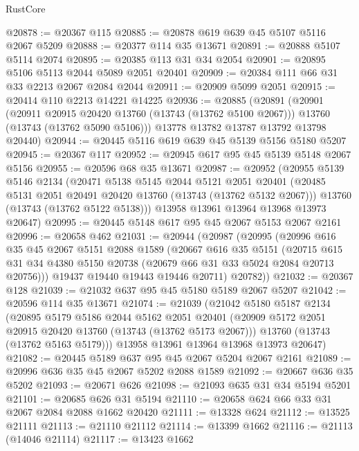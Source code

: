 \begin{lexlean}{RustCore}
\begin{coremodule}
@20878 := @20367 @115
@20885 := @20878 @619 @639 @45 @5107 @5116 @2067 @5209
@20888 := @20377 @114 @35 @13671
@20891 := @20888 @5107 @5114 @2074
@20895 := @20385 @113 @31 @34 @2054
@20901 := @20895 @5106 @5113 @2044 @5089 @2051 @20401
@20909 := @20384 @111 @66 @31 @33 @2213 @2067 @2084 @2044
@20911 := @20909 @5099 @2051
@20915 := @20414 @110 @2213 @14221 @14225
@20936 := @20885
    (@20891
      (@20901
        (@20911 @20915 @20420 @13760 (@13743 (@13762 @5100 @2067)))
        @13760
        (@13743 (@13762 @5090 @5106)))
      @13778
      @13782
      @13787
      @13792
      @13798
      @20440)
@20944 := @20445 @5116 @619 @639 @45 @5139 @5156 @5180 @5207
@20945 := @20367 @117
@20952 := @20945 @617 @95 @45 @5139 @5148 @2067 @5156
@20955 := @20596 @68 @35 @13671
@20987 := @20952
    (@20955
      @5139
      @5146
      @2134
      (@20471
        @5138
        @5145
        @2044
        @5121
        @2051
        @20401
        (@20485 @5131 @2051 @20491 @20420 @13760 (@13743 (@13762 @5132 @2067)))
        @13760
        (@13743 (@13762 @5122 @5138)))
      @13958
      @13961
      @13964
      @13968
      @13973
      @20647)
@20995 := @20445 @5148 @617 @95 @45 @2067 @5153 @2067 @2161
@20996 := @20658 @462
@21031 := @20944
    (@20987
      (@20995
        (@20996
          @616
          @35
          @45
          @2067
          @5151
          @2088
          @1589
          (@20667
            @616
            @35
            @5151
            (@20715 @615 @31 @34 @4380 @5150 @20738 (@20679 @66 @31 @33 @5024 @2084 @20713 @20756)))
          @19437
          @19440
          @19443
          @19446
          @20711)
        @20782))
@21032 := @20367 @128
@21039 := @21032 @637 @95 @45 @5180 @5189 @2067 @5207
@21042 := @20596 @114 @35 @13671
@21074 := @21039
    (@21042
      @5180
      @5187
      @2134
      (@20895
        @5179
        @5186
        @2044
        @5162
        @2051
        @20401
        (@20909 @5172 @2051 @20915 @20420 @13760 (@13743 (@13762 @5173 @2067)))
        @13760
        (@13743 (@13762 @5163 @5179)))
      @13958
      @13961
      @13964
      @13968
      @13973
      @20647)
@21082 := @20445 @5189 @637 @95 @45 @2067 @5204 @2067 @2161
@21089 := @20996 @636 @35 @45 @2067 @5202 @2088 @1589
@21092 := @20667 @636 @35 @5202
@21093 := @20671 @626
@21098 := @21093 @635 @31 @34 @5194 @5201
@21101 := @20685 @626 @31 @5194
@21110 := @20658 @624 @66 @33 @31 @2067 @2084 @2088 @1662 @20420
@21111 := @13328 @624
@21112 := @13525 @21111
@21113 := @21110 @21112
@21114 := @13399 @1662
@21116 := @21113 (@14046 @21114)
@21117 := @13423 @1662

\end{coremodule}
\end{lexlean}
